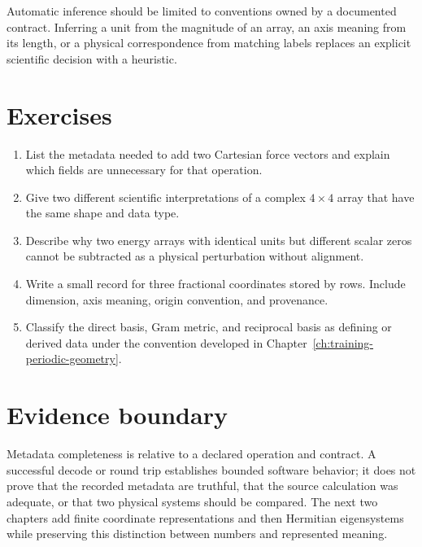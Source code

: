 Automatic inference should be limited to conventions owned by a documented
contract. Inferring a unit from the magnitude of an array, an axis meaning from
its length, or a physical correspondence from matching labels replaces an
explicit scientific decision with a heuristic.

\section{Exercises}

\begin{enumerate}
  \item List the metadata needed to add two Cartesian force vectors and explain
        which fields are unnecessary for that operation.
  \item Give two different scientific interpretations of a complex
        \(4\times4\) array that have the same shape and data type.
  \item Describe why two energy arrays with identical units but different
        scalar zeros cannot be subtracted as a physical perturbation without
        alignment.
  \item Write a small record for three fractional coordinates stored by rows.
        Include dimension, axis meaning, origin convention, and provenance.
  \item Classify the direct basis, Gram metric, and reciprocal basis as defining
        or derived data under the convention developed in
        Chapter~\ref{ch:training-periodic-geometry}.
\end{enumerate}

\section{Evidence boundary}

Metadata completeness is relative to a declared operation and contract. A
successful decode or round trip establishes bounded software behavior; it does
not prove that the recorded metadata are truthful, that the source calculation
was adequate, or that two physical systems should be compared. The next two
chapters add finite coordinate representations and then Hermitian eigensystems
while preserving this distinction between numbers and represented meaning.
